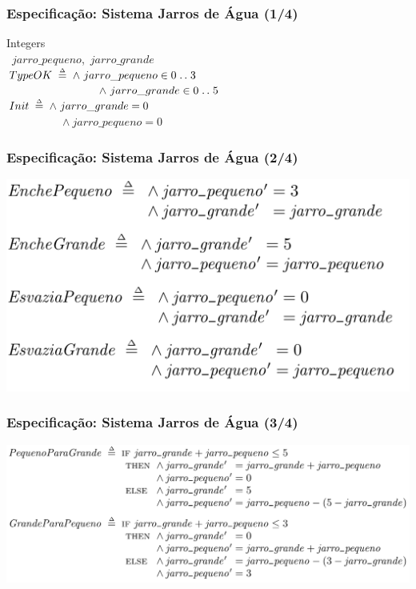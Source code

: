 \documentclass{beamer}
\begin{document}
\begin{frame}
  \frametitle{Especificação: Sistema Jarros de Água (1/4)}
  {\EXTENDS} Integers\\
  \vspace{8.0pt}
  \VARIABLES\ $jarro\_pequeno$,\, $jarro\_grande$\\
  \vspace{8.0pt}
  $TypeOK \;\mathrel{\smash {{\stackrel{\scriptscriptstyle\Delta}{=}}}}\; \land\ jarro\_pequeno \in 0 \mathrel{\ldotp\ldotp} 3$\\
  ~~~~~~~~~~~~~~~~\,$\land\ jarro\_grande \in 0 \mathrel{\ldotp\ldotp} 5$\\
  \vspace{8.0pt}
  $Init \;\mathrel{\smash {{\stackrel{\scriptscriptstyle\Delta}{=}}}}\; \land\ jarro\_grande = 0$\\
  ~~~~~~~~~~$\land\ jarro\_pequeno = 0$
  \vspace{8.0pt}%
\end{frame}

\begin{frame}
  \frametitle{Especificação: Sistema Jarros de Água (2/4)}
  \includegraphics[scale=0.25]{img/jarros_1.png}
\end{frame}

\begin{frame}
  \frametitle{Especificação: Sistema Jarros de Água (3/4)}
  \hspace*{-10mm}
  \includegraphics[scale=0.29]{img/jarros_2.png}
\end{frame}
\end{document}
